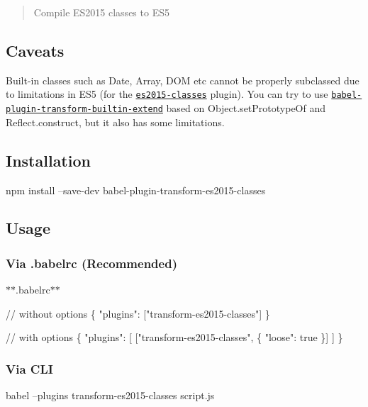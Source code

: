 \begin{quote}
Compile E\+S2015 classes to E\+S5 \end{quote}


\subsection*{Caveats}

Built-\/in classes such as {\ttfamily Date}, {\ttfamily Array}, {\ttfamily D\+OM} etc cannot be properly subclassed due to limitations in E\+S5 (for the \href{http://babeljs.io/docs/plugins/transform-es2015-classes}{\tt es2015-\/classes} plugin). You can try to use \href{https://github.com/loganfsmyth/babel-plugin-transform-builtin-extend}{\tt babel-\/plugin-\/transform-\/builtin-\/extend} based on {\ttfamily Object.\+set\+Prototype\+Of} and {\ttfamily Reflect.\+construct}, but it also has some limitations.

\subsection*{Installation}


\begin{DoxyCode}
npm install --save-dev babel-plugin-transform-es2015-classes
\end{DoxyCode}


\subsection*{Usage}

\subsubsection*{Via {\ttfamily .babelrc} (Recommended)}

$\ast$$\ast$.babelrc$\ast$$\ast$


\begin{DoxyCode}
// without options
\{
  "plugins": ["transform-es2015-classes"]
\}

// with options
\{
  "plugins": [
    ["transform-es2015-classes", \{
      "loose": true
    \}]
  ]
\}
\end{DoxyCode}


\subsubsection*{Via C\+LI}


\begin{DoxyCode}
babel --plugins transform-es2015-classes script.js
\end{DoxyCode}



